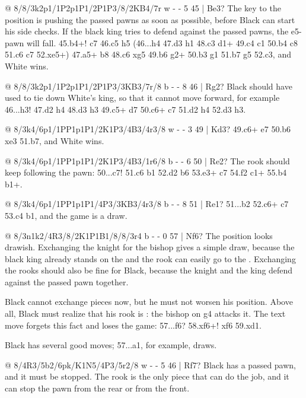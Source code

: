@ 8/8/3k2p1/1P2p1P1/2P1P3/8/2KB4/7r w - - 5 45 | Be3?
The key to the position is pushing the passed pawns as soon as possible, before Black can start his
side checks. If the black king tries to defend against the passed pawns, the e5-pawn will fall.
45.\B b4+! \K c7 46.c5 \R h5 (46...\R h4 47.\K d3 \R h1 48.\B c3 \R d1+ 49.\K c4 \R c1 50.\K b4 \K c8
51.c6 \K c7 52.\B xe5+) 47.\B a5+ \K b8 48.c6 \R xg5 49.b6 \R g2+ 50.\K b3 \R g1 51.b7 g5 52.\B c3, and White wins.

@ 8/8/3k2p1/1P2p1P1/2P1P3/3KB3/7r/8 b - - 8 46 | Rg2?
Black should have used  to tie down White's king, so that it
cannot move forward, for example 46...\R h3! 47.\K d2 \R h4 48.\K d3 \R h3 49.c5+ \K d7 50.c6+ \K c7
51.\K d2 \R h4 52.\K d3 \R h3.

@ 8/3k4/6p1/1PP1p1P1/2K1P3/4B3/4r3/8 w - - 3 49 | Kd3?
49.c6+ \K e7 50.b6 \R xe3 51.b7, and White wins.

@ 8/3k4/6p1/1PP1p1P1/2K1P3/4B3/1r6/8 b - - 6 50 | Re2?
The rook should keep following the pawn: 50...\K c7! 51.c6 \R b1 52.\B d2 \K b6 53.\B e3+ \K c7 54.\B f2 \R c1+ 55.\K b4 \R b1+.

@ 8/3k4/6p1/1PP1p1P1/4P3/3KB3/4r3/8 b - - 8 51 | Re1?
51...\R b2 52.c6+ \K c7 53.\K c4 \R b1, and the game is a draw.

@ 8/3n1k2/4R3/8/2K1P1B1/8/8/3r4 b - - 0 57 | Nf6?
The position looks drawish. Exchanging the knight for the bishop gives a simple draw, because the black king already stands on the  and the rook can easily go to the . Exchanging the rooks should also be fine for Black, because the knight and the king defend against the passed pawn together.

Black cannot exchange pieces now, but he must not worsen his position. Above all, Black must realize that his rook is : the bishop on g4 attacks it. The text move forgets this fact and loses the game: 57...\N f6? 58.\R xf6+! \K xf6 59.\B xd1.

Black has several good moves; 57...\R a1, for example, draws.

@ 8/4R3/5b2/6pk/K1N5/4P3/5r2/8 w - - 5 46 | Rf7?
Black has a passed pawn, and it must be stopped. The rook is the only piece that can do the job, and it can stop the pawn from the rear or from the front.

